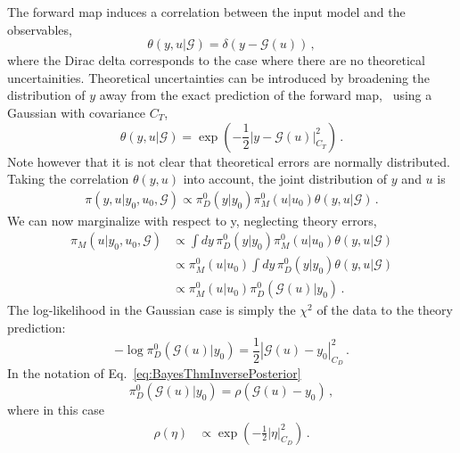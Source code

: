 The forward map induces a correlation between the input model and the
observables, 
\begin{equation}
  \label{eq:ThetaCorr}
  \theta(y,u|\mathcal{G}) = \delta\left(y - \mathcal{G}(u)\right)\, ,
\end{equation}
where the Dirac delta corresponds to the case where there are no theoretical
uncertainities. Theoretical uncertainties can be introduced by broadening the
distribution of $y$ away from the exact prediction of the forward map, \eg\
using a Gaussian with covariance $C_T$,
\begin{equation}
  \label{eq:TheoryErrors}
  \theta(y,u|\mathcal{G}) = \exp\left(
    -\frac12 
    \left| y - \mathcal{G}(u)
    \right|_{C_T}^2\right)\, .
\end{equation}
Note however that it is not clear that theoretical errors are normally
distributed. Taking the correlation $\theta(y,u)$ into account, the joint
distribution of $y$ and $u$ is
\begin{align}
  \label{eq:JointYAndU}
  \pi(y,u|y_0,u_0,\mathcal{G}) \propto 
  \pi_{D}^0(y|y_0) \pi_{M}^0(u|u_0) \theta(y,u|\mathcal{G})\, .
\end{align}
We can now marginalize with respect to y, neglecting theory errors, 
\begin{align}
  \label{eq:MarginOne}
  \pi_M(u|y_0,u_0,\mathcal{G}) 
  &\propto \int dy\, \pi_{D}^0(y|y_0) \pi_{M}^0(u|u_0) 
    \theta(y,u|\mathcal{G}) \\
  & \propto \pi_{M}^0(u|u_0)  \int dy\, \pi_{D}^0(y|y_0) 
    \theta(y,u|\mathcal{G}) \\
  & \propto \pi_{M}^0(u|u_0) \pi_{D}^0(\mathcal{G}(u)|y_0)\, .
\end{align}
The log-likelihood in the Gaussian case is simply the $\chi^2$ of the data to
the theory prediction:
\begin{equation}
  \label{eq:LikelyChiSq}
  -\log\pi_D^0(\mathcal{G}(u)|y_0) =  
      \frac12 \left|
      \mathcal{G}(u) - y_0
      \right|_{C_D}^2
    \, .
\end{equation}
In the notation of Eq.~\ref{eq:BayesThmInversePosterior}
\begin{equation}
  \label{eq:IdentifyRho}
  \pi_D^0(\mathcal{G}(u)|y_0) = \rho\left(
    \mathcal{G}(u) - y_0
  \right)\, ,
\end{equation}
where in this case 
\begin{align}
  \label{eq:RhoGauss}
  \rho(\eta) &\propto \exp\left(
               -\frac12 \left|\eta\right|_{C_D}^2
               \right)\, .
\end{align}
